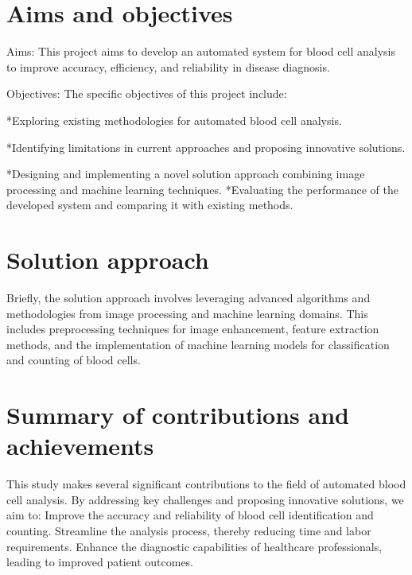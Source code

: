 \begin{itemize}
\section{Aims and objectives}
\label{sec:intro_aims_obj}
Aims: This project aims to develop an automated system for blood cell analysis to improve accuracy, efficiency, and reliability in disease diagnosis.

Objectives: The specific objectives of this project include: 

*Exploring existing methodologies for automated blood cell analysis.

*Identifying limitations in current approaches and proposing innovative solutions. 

*Designing and implementing a novel solution approach combining image processing and machine learning techniques. 
*Evaluating the performance of the developed system and comparing it with existing methods.




\section{Solution approach}
\label{sec:intro_sol} %
Briefly, the solution approach involves leveraging advanced algorithms and methodologies from image processing and machine learning domains. This includes preprocessing techniques for image enhancement, feature extraction methods, and the implementation of machine learning models for classification and counting of blood cells.



\section{Summary of contributions and achievements} %
\label{sec:intro_sum_results} %
 This study makes several significant contributions to the field of automated blood cell analysis. By addressing key challenges and proposing innovative solutions, we aim to: Improve the accuracy and reliability of blood cell identification and counting. Streamline the analysis process, thereby reducing time and labor requirements. Enhance the diagnostic capabilities of healthcare professionals, leading to improved patient outcomes.



\end{itemize}
